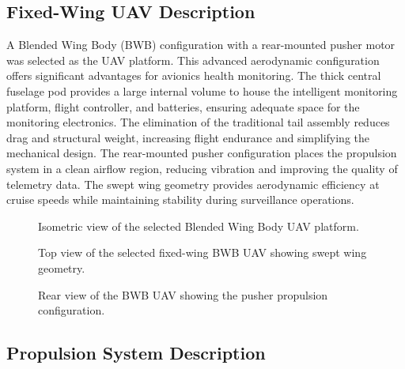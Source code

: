 \subsection{Fixed-Wing UAV Description}

A Blended Wing Body (BWB) configuration with a rear-mounted pusher motor was selected as the UAV platform. This advanced aerodynamic configuration offers significant advantages for avionics health monitoring. The thick central fuselage pod provides a large internal volume to house the intelligent monitoring platform, flight controller, and batteries, ensuring adequate space for the monitoring electronics. The elimination of the traditional tail assembly reduces drag and structural weight, increasing flight endurance and simplifying the mechanical design. The rear-mounted pusher configuration places the propulsion system in a clean airflow region, reducing vibration and improving the quality of telemetry data. The swept wing geometry provides aerodynamic efficiency at cruise speeds while maintaining stability during surveillance operations.

\begin{figure}[H]
\centering
\caption{Isometric view of the selected Blended Wing Body UAV platform.}
\label{fig:uav_isometric}
\end{figure}

\begin{figure}[H]
\centering
\caption{Top view of the selected fixed-wing BWB UAV showing swept wing geometry.}
\label{fig:uav_top}
\end{figure}

\begin{figure}[H]
\centering
\caption{Rear view of the BWB UAV showing the pusher propulsion configuration.}
\label{fig:uav_rear}
\end{figure}

\subsection{Propulsion System Description}

